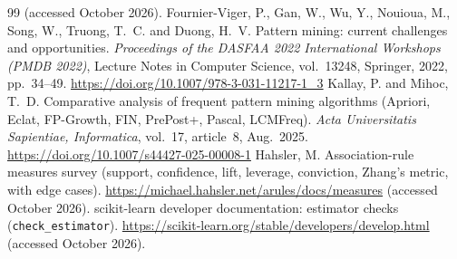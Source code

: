 \documentclass[twocolumn,10pt]{article}
\begin{document}
\begin{thebibliography}{99}
(accessed October 2026).
 Fournier-Viger, P., Gan, W., Wu, Y., Nouioua, M.,
Song, W., Truong, T.~C. and Duong, H.~V. Pattern mining: current challenges
and opportunities. \emph{Proceedings of the DASFAA 2022 International
Workshops (PMDB 2022)}, Lecture Notes in Computer Science, vol.~13248,
Springer, 2022, pp.~34--49. \url{https://doi.org/10.1007/978-3-031-11217-1_3}
 Kallay, P. and Mihoc, T.~D. Comparative analysis of
frequent pattern mining algorithms (Apriori, Eclat, FP-Growth, FIN,
PrePost+, Pascal, LCMFreq). \emph{Acta Universitatis Sapientiae, Informatica},
vol.~17, article~8, Aug.~2025. \url{https://doi.org/10.1007/s44427-025-00008-1}
 Hahsler, M. Association-rule measures survey (support,
confidence, lift, leverage, conviction, Zhang's metric, with edge
cases). \url{https://michael.hahsler.net/arules/docs/measures}
(accessed October 2026).
 scikit-learn developer documentation: estimator
checks (\texttt{check\_estimator}).
\url{https://scikit-learn.org/stable/developers/develop.html}
(accessed October 2026).
\end{thebibliography}

\appendix
\end{document}
